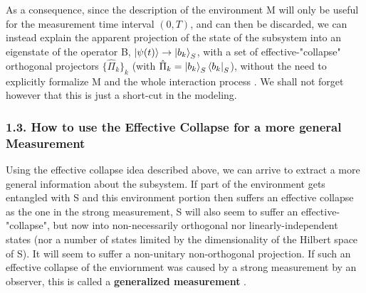 \documentclass[11pt, a4paper]{article} %
\begin{document}
As a consequence, since the description of the environment M will only be useful for the measurement time interval $(0,T)$, and can then be discarded, we can instead explain the apparent projection of the state of the subsystem into an eigenstate of the operator B, $\ket{\psi(t)}\to \ket{b_k}_S$, with a set of effective-"collapse" orthogonal projectors $\{\hat{\Pi}_k\}_k$ (with $\hat{\Pi}_k=\ket{b_k}_S\bra{b_k}_S$), without the need to explicitly formalize M and the whole interaction process \cite{Durr}. We shall not forget however that this is just a short-cut in the modeling.\vspace{-0.3cm}



\subsubsection*{1.3. How to use the Effective Collapse for a more general Measurement}\vspace{-0.1cm}

Using the effective collapse idea described above, we can arrive to extract a more general information about the subsystem. If part of the environment gets entangled with S and this environment portion then suffers an effective collapse as the one in the strong measurement, S will also seem to suffer an effective-"collapse", but now into non-necessarily orthogonal nor linearly-independent states (nor a number of states limited by the dimensionality of the Hilbert space of S). It will seem to suffer a non-unitary non-orthogonal projection. If such an effective collapse of the enviornment was caused by a strong measurement by an observer, this is called a {\bf generalized measurement} \cite{Generalized, Durr}. 
\end{document}
